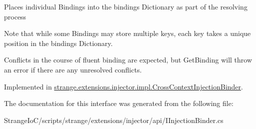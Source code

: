 Places individual Bindings into the bindings Dictionary as part of the resolving process 

Note that while some Bindings may store multiple keys, each key takes a unique position in the bindings Dictionary.

Conflicts in the course of fluent binding are expected, but Get\-Binding will throw an error if there are any unresolved conflicts. 

Implemented in \hyperlink{classstrange_1_1extensions_1_1injector_1_1impl_1_1_cross_context_injection_binder_ad93ea865f14a6249af575633f6472a7e}{strange.\-extensions.\-injector.\-impl.\-Cross\-Context\-Injection\-Binder}.



The documentation for this interface was generated from the following file\-:\begin{DoxyCompactItemize}
\item 
Strange\-Io\-C/scripts/strange/extensions/injector/api/I\-Injection\-Binder.\-cs\end{DoxyCompactItemize}
